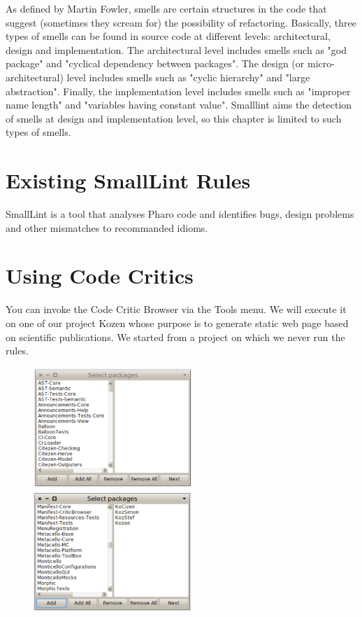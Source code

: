 \documentclass[a4paper,10pt,twoside]{book}
\begin{document}
As defined by Martin Fowler, smells are certain structures in the code that suggest (sometimes they scream for) the possibility of refactoring.
Basically, three types of smells can be found in source code at different levels: architectural, design and implementation. The architectural level includes smells such as "god package" and "cyclical dependency between packages". The design (or micro-architectural) level includes smells such as "cyclic hierarchy" and "large abstraction". Finally, the implementation level includes smells such as "improper name length" and "variables having constant value". Smalllint aims the detection of smells at design and implementation level, so this chapter is limited to such types of smells.



\section{Existing SmallLint Rules}\label{existingRules}
SmallLint is a tool that analyses Pharo code and identifies bugs, design problems and other mismatches to recommanded idioms. 







\section{Using Code Critics}

You can invoke the Code Critic Browser via the Tools menu. We will execute it on one of our project Kozen whose purpose is to generate static web page based on scientific publications. We started from a project on which we never run the rules. 
\begin{figure}[h]
\centering
\includegraphics[width=6cm]{selectingPackage}\includegraphics[width=6cm]{selectingPackage2} 
\end{figure}
\end{document}
